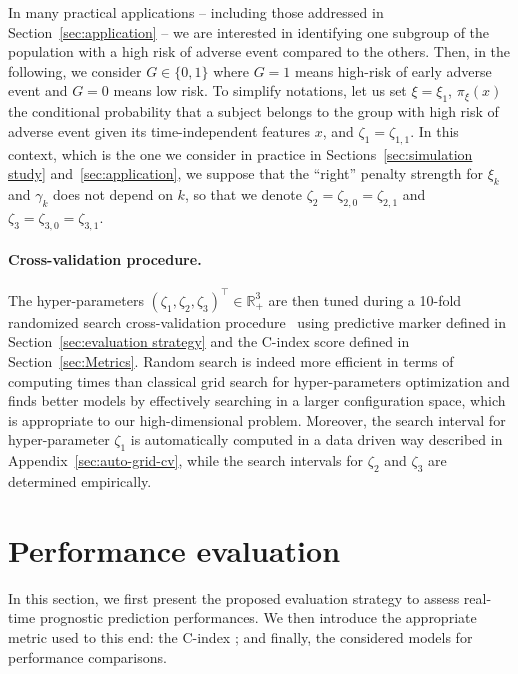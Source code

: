 \documentclass[11pt]{article}
\newcommand{\R}{\mathds R}
\begin{document}
In many practical applications -- including those addressed in Section~\ref{sec:application} -- we are interested in identifying one subgroup of the population with a high risk of adverse event compared to the others. Then, in the following, we consider $G \in \{ 0, 1\}$ where $G=1$ means high-risk of early adverse event and $G=0$ means low risk.
To simplify notations, let us set $\xi = \xi_1$, $\pi_\xi(x)$ the conditional probability that a subject belongs to the group with high risk of adverse event given its time-independent features $x$, and $\zeta_1 = \zeta_{1,1}$.
In this context, which is the one we consider in practice in Sections~\ref{sec:simulation study} and~\ref{sec:application}, we suppose that the ``right'' penalty strength for $\xi_k$ and $\gamma_k$ does not depend on $k$, so that we denote $\zeta_2 = \zeta_{2,0} = \zeta_{2,1}$ and $\zeta_3 = \zeta_{3,0} = \zeta_{3,1}$. 

\paragraph{Cross-validation procedure.}

The hyper-parameters $(\zeta_1, \zeta_2, \zeta_3)^\top \in \R_+^3$ are then tuned during a 10-fold randomized search cross-validation procedure~\citep{bergstra2012random} using predictive marker defined in Section~\ref{sec:evaluation strategy} and the C-index score defined in Section~\ref{sec:Metrics}.
Random search is indeed more efficient in terms of computing times than classical grid search for hyper-parameters optimization and finds better models by effectively searching in a larger configuration space, which is appropriate to our high-dimensional problem. Moreover, the search interval for hyper-parameter $\zeta_1$ is automatically computed in a data driven way described in Appendix~\ref{sec:auto-grid-cv}, while the search intervals for $\zeta_2$ and $\zeta_3$ are determined empirically.


\section{Performance evaluation}
\label{sec:Performance evaluation}

In this section, we first present the proposed evaluation strategy to assess real-time prognostic prediction performances. We then introduce the appropriate metric used to this end: the C-index ; and finally, the considered models for performance comparisons.
\end{document}
